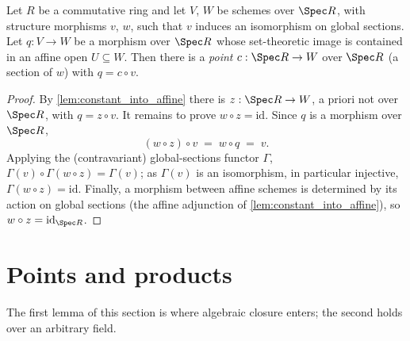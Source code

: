\begin{lemma}
  \label{lem:constant_into_affine_over}
  \leanok
  Let \(R\) be a commutative ring and let \(V\), \(W\) be schemes over \(\Spec R\), with
  structure morphisms \(v\), \(w\), such that \(v\) induces an isomorphism on global
  sections. Let \(q : V \to W\) be a morphism over \(\Spec R\) whose set-theoretic image is
  contained in an affine open \(U \subseteq W\). Then there is a \emph{point}
  \(c : \Spec R \to W\) over \(\Spec R\) (a section of \(w\)) with \(q = c \circ v\).
\end{lemma}
\begin{proof}
  \leanok
  By \ref{lem:constant_into_affine} there is \(z : \Spec R \to W\), a priori not over
  \(\Spec R\), with \(q = z \circ v\). It remains to prove \(w \circ z = \mathrm{id}\).
  Since \(q\) is a morphism over \(\Spec R\),
  \[
    (w \circ z) \circ v \;=\; w \circ q \;=\; v .
  \]
  Applying the (contravariant) global-sections functor \(\Gamma\),
  \(\Gamma(v) \circ \Gamma(w \circ z) = \Gamma(v)\); as \(\Gamma(v)\) is an isomorphism, in
  particular injective, \(\Gamma(w \circ z) = \mathrm{id}\). Finally, a morphism between
  affine schemes is determined by its action on global sections (the affine adjunction of
  \ref{lem:constant_into_affine}), so \(w \circ z = \mathrm{id}_{\Spec R}\).
\end{proof}

\section{Points and products}
\label{sec:points_products}

The first lemma of this section is where algebraic closure enters; the second holds over an
arbitrary field.

